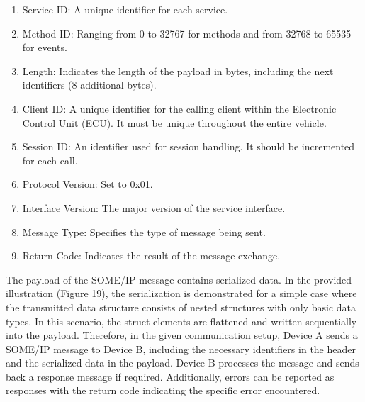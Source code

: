 \documentclass[
12pt,
oneside, 
onehalfspacing, 
nolistspacing, 
parskip, 
chapterinoneline, 
]{AASTCOMPUTER}
\begin{document}
\begin{enumerate}
\item Service ID: A unique identifier for each service.
\item Method ID: Ranging from 0 to 32767 for methods and from 32768 to 65535 for events.
\item Length: Indicates the length of the payload in bytes, including the next identifiers (8 additional bytes).
\item Client ID: A unique identifier for the calling client within the Electronic Control Unit (ECU). It must be unique throughout the entire vehicle.
\item Session ID: An identifier used for session handling. It should be incremented for each call.
\item Protocol Version: Set to 0x01.
\item Interface Version: The major version of the service interface.
\item Message Type: Specifies the type of message being sent.
\item Return Code: Indicates the result of the message exchange.
\end{enumerate}
The payload of the SOME/IP message contains serialized data. In the provided illustration (Figure 19), the serialization is demonstrated for a simple case where the transmitted data structure consists of nested structures with only basic data types. In this scenario, the struct elements are flattened and written sequentially into the payload. Therefore, in the given communication setup, Device A sends a SOME/IP message to Device B, including the necessary identifiers in the header and the serialized data in the payload. Device B processes the message and sends back a response message if required. Additionally, errors can be reported as responses with the return code indicating the specific error encountered.
\end{document}
